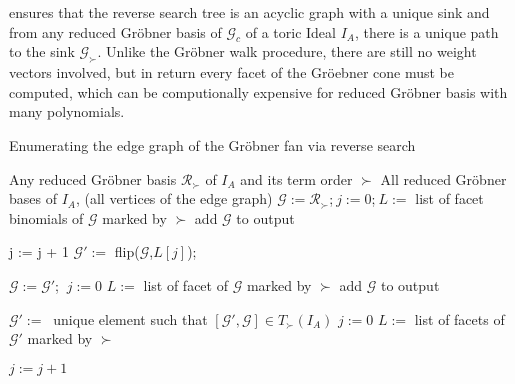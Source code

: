 \newpage

\cite{tigers} ensures that the reverse search tree is an acyclic graph with a unique sink and from any reduced Gröbner basis of $\mathcal{G}_{c} $ of a toric Ideal $I_{A}$, there is a unique path to the sink $\mathcal{G}_{\succ} $.
Unlike the Gröbner walk procedure, there are still no weight vectors involved, but in return every facet of the Gröebner cone must be computed, which can be computionally expensive for reduced Gröbner basis with many polynomials.

\begin{algorithm}
\caption{Enumerating the edge graph of the Gröbner fan via reverse search \cite{tigers}}
\label{alg:reverse}
\begin{algorithmic}[1]

\Input
Any reduced Gröbner basis $ \mathcal{R}_{\succ} $ of $I_A$ and its term order $\succ$
\Output All reduced Gröbner bases of $I_A$, (all vertices of the edge graph)
\State $\mathcal{G} := \mathcal{R}_{\succ}$;$~j := 0$;$~L := $ list of facet binomials of $\mathcal{G}$ marked by $\succ$
\State add $\mathcal{G}$ to output
\Repeat
{}

\State j := j + 1
\State $\mathcal{G}':= $ flip($\mathcal{G}$,$L[j]$);

\State $\mathcal{G} := \mathcal{G}' $;   $~j := 0$
\State $ L := $ list of facet of $\mathcal{G}$ marked by $\succ$
\State add $ \mathcal{G}$ to output

\EndIf 

\EndWhile

\State $\mathcal{G}' :=~$ unique element such that $[\mathcal{G}',\mathcal{G}] \in T_{\succ}(I_{A}) $
\State $j := 0$
\State $L := $ list of facets of $\mathcal{G}'$ marked by $\succ$

\Repeat
\State $j := j + 1$

\EndIf



\end{algorithmic}
\end{algorithm}

\newpage

